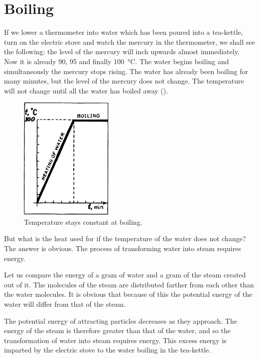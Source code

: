 \section{Boiling}

If we lower a thermometer into water which has been poured into a tea-kettle, turn on the electric stove and watch the mercury in the thermometer, we shall see the following: the level of the mercury will inch upwards almost immediately. Now it is already 90, 95 and finally \SI{100}{\celsius}. The water begins boiling and simultaneously the mercury stops rising. The water has already been boiling for many minutes, but the level of the mercury does not change. The temperature will not change until all the water has boiled away ().

\begin{figure}[!ht]
\centering
\includegraphics[width=0.4\textwidth]{figures/fig-04-01.pdf}
\caption{Temperature stays constant at boiling.}
\label{fig-4.1}
\end{figure}

But what is the heat used for if the temperature of the water does not change? The answer is obvious. The process of transforming water into steam requires energy.

Let us compare the energy of a gram of water and a gram of the steam created out of it. The molecules of the steam are distributed farther from each other than the water molecules. It is obvious that because of this the potential energy of the water will differ from that of the steam.

The potential energy of attracting particles decreases as they approach. The energy of the steam is therefore greater than that of the water, and so the transformation of water into steam requires energy. This excess energy is imparted by the electric stove to the water boiling in the tea-kettle.

